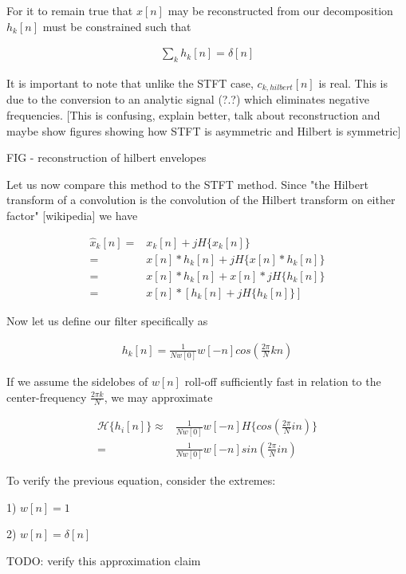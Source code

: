 \documentclass [11pt, proquest] {uwthesis}[2015/03/03]
\begin{document}
For it to remain true that $x[n]$ may be reconstructed from our decomposition $h_k[n]$ must be constrained such that 

\begin{align}
\sum_k h_k[n] = \delta[n]
\end{align}

It is important to note that unlike the STFT case, $c_{k,hilbert}[n]$ is real.  This is due to the conversion to an analytic signal (?.?) which eliminates negative frequencies.  [This is confusing, explain better, talk about reconstruction and maybe show figures showing how STFT is asymmetric and Hilbert is symmetric]

FIG - reconstruction of hilbert envelopes

Let us now compare this method to the STFT method.  Since "the Hilbert transform of a convolution is the convolution of the Hilbert transform on either factor" [wikipedia] we have 

\begin{align}
\label{eq:x_analytic}
\widehat{x}_k[n] =& x_k[n] + jH\{x_k[n]\} \nonumber \\
=& x[n] * h_k[n] + jH\{x[n] * h_k[n]\} \nonumber \\
=& x[n] * h_k[n] + x[n] * jH\{h_k[n]\} \nonumber \\
=& x[n] * [h_k[n]+  jH\{h_k[n]\}]
\end{align}

Now let us define our filter specifically as

\begin{align}
\label{eq:hilbert_constrained_filter}
h_k[n] = \frac{1}{Nw[0]}w[-n]cos(\frac{2\pi}{N}kn)
\end{align}

If we assume the sidelobes of $w[n]$ roll-off sufficiently fast in relation to the center-frequency $\frac{2\pi k}{N}$, we may approximate

\begin{align}
\mathcal{H}\{h_i[n]\} \approx& \frac{1}{Nw[0]}w[-n] H\{cos(\frac{2\pi}{N}in)\} \nonumber \\
=& \frac{1}{Nw[0]}w[-n]sin(\frac{2\pi}{N}in)
\end{align}

To verify the previous equation, consider the extremes:

1) $w[n] = 1$

2) $w[n] = \delta[n]$

TODO: verify this approximation claim
\end{document}
